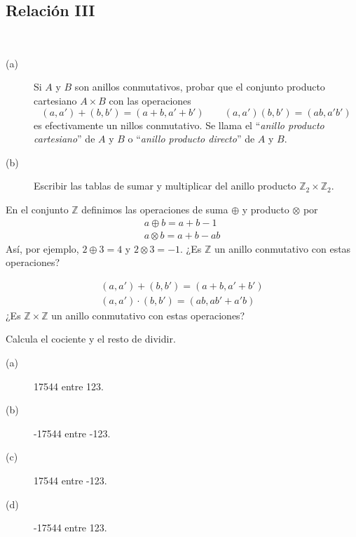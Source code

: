 \subsection{Relación III}

\begin{ejercicio}
    \ 
    \begin{description}
        \item [(a)] 
            Si $A$ y $B$ son anillos conmutativos, probar que el conjunto producto cartesiano $A\times B$ con las operaciones
            \begin{equation*}
                (a,a')+(b,b')=(a+b,a'+b')\qquad (a,a')(b,b')=(ab,a'b')
            \end{equation*}
            es efectivamente un nillos conmutativo. Se llama el ``\emph{anillo producto cartesiano}'' de $A$ y $B$ o ``\emph{anillo producto directo}'' de $A$ y $B$.
        \item [(b)] Escribir las tablas de sumar y multiplicar del anillo producto $\mathbb{Z}_2\times \mathbb{Z}_2$.
    \end{description}
\end{ejercicio}

\begin{ejercicio}
    En el conjunto $\mathbb{Z}$ definimos las operaciones de suma $\oplus$ y producto $\otimes$ por
    \begin{gather*}
        a \oplus b = a + b - 1 \\
        a \otimes b = a + b - ab
    \end{gather*}
    Así, por ejemplo, $2\oplus 3 = 4$ y $2\otimes 3 = -1$. ¿Es $\mathbb{Z}$ un anillo conmutativo con estas operaciones?
\end{ejercicio}

\begin{ejercicio}
    \begin{gather*}
        (a,a') + (b,b') = (a+b, a'+b') \\
        (a,a')\cdot (b,b') = (ab, ab'+a'b)
    \end{gather*}
    ¿Es $\mathbb{Z}\times \mathbb{Z}$ un anillo conmutativo con estas operaciones?
\end{ejercicio}

\begin{ejercicio}
    Calcula el cociente y el resto de dividir.
    \begin{description}
        \item [(a)] 17544 entre 123.
        \item [(b)] -17544 entre -123.
        \item [(c)] 17544 entre -123.
        \item [(d)] -17544 entre 123.
    \end{description}
\end{ejercicio}


